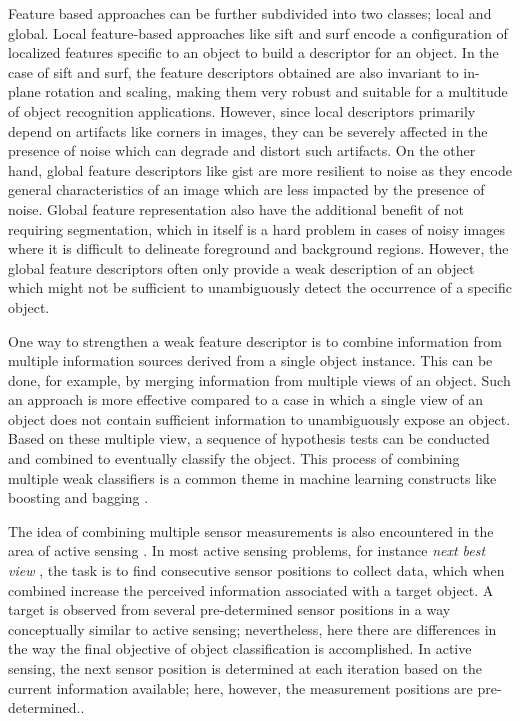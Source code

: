 \documentclass {udthesis}
\begin{document}
Feature based approaches can be further subdivided into two classes; local and global. Local feature-based approaches like \gls{sift} \cite{sift} and \gls{surf} \cite{surf} encode a configuration of localized features specific to an object to build a descriptor for an object. In the case of \gls{sift} and \gls{surf}, the feature descriptors obtained are also invariant to in-plane rotation and scaling, making them very robust and suitable for a multitude of object recognition applications. However, since local descriptors primarily depend on artifacts like corners in images, they can be severely affected in the presence of noise which can degrade and distort such artifacts. On the other hand, global feature descriptors like gist \cite{gist} are more resilient to noise as they encode general characteristics of an image which are less impacted by the presence of noise. Global feature representation also have the additional benefit of not requiring segmentation, which in itself is a hard problem in cases of noisy images where it is difficult to delineate foreground and background regions. However, the global feature descriptors often only provide a weak description of an object which might not be sufficient to unambiguously detect the occurrence  of a specific object.

One way to strengthen a weak feature descriptor is to combine information from multiple information sources derived from a single object instance. This can be done, for example, by merging information from multiple views of an object. Such an approach is more effective compared to a case in which a single view of an object does not contain sufficient information to unambiguously expose an object. Based on these multiple view, a sequence of hypothesis tests can be conducted and combined to eventually classify the object. This process of combining multiple weak classifiers is a common theme in machine learning constructs like boosting and bagging \cite{alpaydin}.

The idea of combining multiple sensor measurements is also encountered in the area of active sensing \cite{chen}. In most active sensing problems, for instance \emph{next best view} \cite{roy,dunn}, the task is to find consecutive  sensor positions to collect data, which when combined increase the perceived information  associated with a target object. A target is observed from several pre-determined sensor positions in a way conceptually similar to active sensing; nevertheless, here there are differences in the way the final objective of object classification is accomplished. In active sensing, the next sensor position is determined at each iteration based on the current information available; here, however, the measurement positions are pre-determined..
\end{document}
